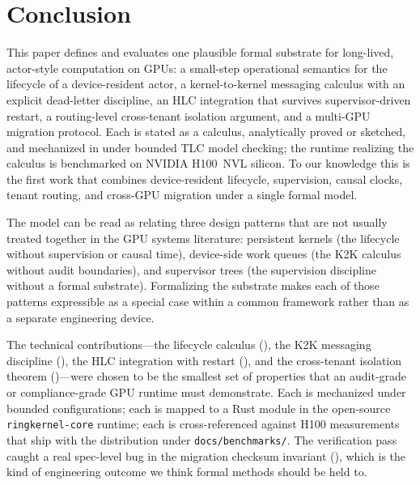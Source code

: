 \section{Conclusion}
\label{sec:conclusion}

This paper defines and evaluates one plausible formal substrate for
long-lived, actor-style computation on GPUs: a small-step
operational semantics for the lifecycle of a device-resident actor,
a kernel-to-kernel messaging calculus with an explicit dead-letter
discipline, an HLC integration that survives supervisor-driven
restart, a routing-level cross-tenant isolation argument, and a
multi-GPU migration protocol.  Each is stated as a calculus,
analytically proved or sketched, and mechanized in \TLA{} under
bounded TLC model checking; the runtime realizing the calculus is
benchmarked on NVIDIA H100~NVL silicon.  To our knowledge this is
the first work that combines device-resident lifecycle,
supervision, causal clocks, tenant routing, and cross-GPU migration
under a single formal model.

The model can be read as relating three design patterns that are
not usually treated together in the GPU systems literature:
persistent kernels (the lifecycle without supervision or causal
time), device-side work queues (the K2K calculus without audit
boundaries), and supervisor trees (the supervision discipline
without a formal substrate).  Formalizing the substrate makes
each of those patterns expressible as a special case within a
common framework rather than as a separate engineering device.

The technical contributions—the lifecycle calculus
(), the K2K messaging discipline
(), the HLC integration with restart
(), and the cross-tenant isolation theorem
()—were chosen to be the smallest set of
properties that an audit-grade or compliance-grade GPU runtime
must demonstrate.  Each is mechanized under bounded configurations;
each is mapped to a Rust module in the open-source
\texttt{ringkernel-core} runtime; each is cross-referenced against
H100 measurements that ship with the distribution under
\texttt{docs/benchmarks/}.  The verification pass caught a real
spec-level bug in the migration checksum invariant
(), which is the kind of engineering outcome
we think formal methods should be held to.


